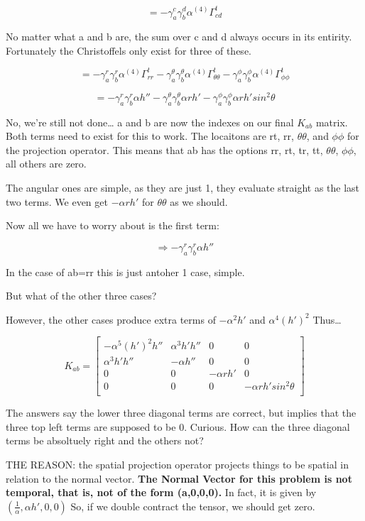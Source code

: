 \documentclass[landscape,letterpaper,10pt,english]{article}
\begin{document}
\[ = -\gamma^c_a \gamma^d_b \alpha {}^{(4)}\Gamma^t_{cd}\]

No matter what a and b are, the sum over c and d always occurs in its
entirity. Fortunately the Christoffels only exist for three of these.

\[ = -\gamma^r_a \gamma^r_b \alpha {}^{(4)}\Gamma^t_{rr} -\gamma^\theta_a \gamma^\theta_b \alpha {}^{(4)}\Gamma^t_{\theta\theta}-\gamma^\phi_a \gamma^\phi_b \alpha {}^{(4)}\Gamma^t_{\phi\phi}\]

\[ = -\gamma^r_a \gamma^r_b \alpha h'' -\gamma^\theta_a \gamma^\theta_b \alpha rh' -\gamma^\phi_a \gamma^\phi_b \alpha rh'sin^2\theta\]

    No, we're still not done\ldots{} a and b are now the indexes on our
final \(K_{ab}\) matrix. Both terms need to exist for this to work. The
locaitons are rt, rr, \(\theta\theta\), and \(\phi\phi\) for the
projection operator. This means that ab has the options rr, rt, tr, tt,
\(\theta\theta\), \(\phi\phi\), all others are zero.

The angular ones are simple, as they are just 1, they evaluate straight
as the last two terms. We even get \(-\alpha rh'\) for \(\theta\theta\)
as we should.

Now all we have to worry about is the first term:

\[ \Rightarrow -\gamma^r_a \gamma^r_b \alpha h'' \]

In the case of ab=rr this is just antoher 1 case, simple.

But what of the other three cases?

However, the other cases produce extra terms of \(-\alpha^2h'\) and
\(\alpha^4(h')^2\) Thus\ldots{}

    \[ K_{ab} = \begin{bmatrix}
-\alpha^5(h')^2 h'' & \alpha^3 h' h'' & 0 & 0 \\
\alpha^3 h' h'' & -\alpha h'' & 0 & 0 \\
0 & 0 & -\alpha rh' & 0 \\
0 & 0 & 0 & -\alpha rh' sin^2\theta \\
\end{bmatrix}\]

    The answers say the lower three diagonal terms are correct, but implies
that the three top left terms are supposed to be 0. Curious. How can the
three diagonal terms be absoltuely right and the others not?

THE REASON: the spatial projection operator projects things to be
spatial in relation to the normal vector. \textbf{The Normal Vector for
this problem is not temporal, that is, not of the form (a,0,0,0).} In
fact, it is given by \((\frac1\alpha , \alpha h', 0 , 0)\) So, if we
double contract the tensor, we should get zero.
\end{document}
